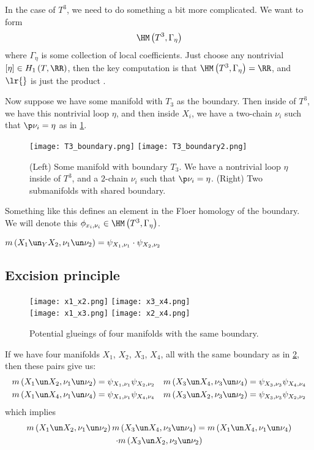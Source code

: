 \documentclass{amsart}
\begin{document}
In the case of $T^3$, we need to do something a bit more complicated. 
We want to form
\begin{equation}
\HM\left( T^3 , \Gamma_\eta \right)
\end{equation}
where $\Gamma_\eta$ is some collection of local coefficients. 
Just choose any nontrivial $\left[ \eta \right] \in H_1\left( T , \RR \right)$, 
then the key computation is that $\HM\left( T^3 , \Gamma_\eta \right) = \RR$, 
and $\lr{}$ is just the product .

Now suppose we have some manifold with $T_3$ as the boundary. 
Then inside of $T^3$, we have this nontrivial loop $\eta$, 
and then inside $X_i$, we have a two-chain $\nu_i$ such that $\p \nu_i = \eta$
as in \cref{fig:T3_boundary}.
\begin{figure}
\texttt{[image: T3\_boundary.png]}
\texttt{[image: T3\_boundary2.png]}
\caption{(Left) Some manifold with boundary $T_3$. 
We have a nontrivial loop $\eta$ inside of $T^3$, 
and a $2$-chain $\nu_i$ such that $\p \nu_i = \eta$.
(Right) Two submanifolds with shared boundary.}
\label{fig:T3_boundary}
\end{figure}
Something like this defines an element in the Floer homology of the boundary. 
We will denote this $\phi_{x_i, \nu_i}\in \HM\left( T^3 , \Gamma_\eta \right)$.

\begin{thm}
$m\left( X_1 \un_Y X_2, \nu_1 \un \nu_2\right) = \psi_{X_1 , \nu_1} \cdot \psi_{X_2 , \nu_2}$
\end{thm}

\subsection{Excision principle}

\begin{figure}
\texttt{[image: x1\_x2.png]}
\texttt{[image: x3\_x4.png]}\\
\texttt{[image: x1\_x3.png]}
\texttt{[image: x2\_x4.png]}
\caption{Potential glueings of four manifolds with the same boundary.}
\label{fig:4_glueings}
\end{figure}

If we have four manifolds $X_1$, $X_2$, $X_3$, $X_4$, all with the same boundary as in
\cref{fig:4_glueings}, then these pairs give us:
\begin{align}
m\left( X_1 \un X_2 , \nu_1\un \nu_2 \right) = \psi_{X_1,  \nu_1} \psi_{X_2 , \nu_2}
&&
m\left( X_3 \un X_4 , \nu_3\un \nu_4 \right) = \psi_{X_3,  \nu_3} \psi_{X_4 , \nu_4}
\\
m\left( X_1 \un X_4 , \nu_1\un \nu_4 \right) = \psi_{X_1,  \nu_1} \psi_{X_4 , \nu_4}
&&
m\left( X_3 \un X_2 , \nu_3\un \nu_2 \right) = \psi_{X_3,  \nu_3} \psi_{X_2 , \nu_2}
\end{align}
which implies
\begin{multline}
m\left( X_1 \un X_2 , \nu_1 \un \nu_2 \right) 
m\left( X_3 \un X_4 , \nu_3 \un \nu_4 \right)  = 
m\left( X_1 \un X_4, \nu_1 \un \nu_4  \right)
\\
\cdot m\left( X_3 \un X_2, \nu_3 \un \nu_2 \right)
\end{multline}
\end{document}
